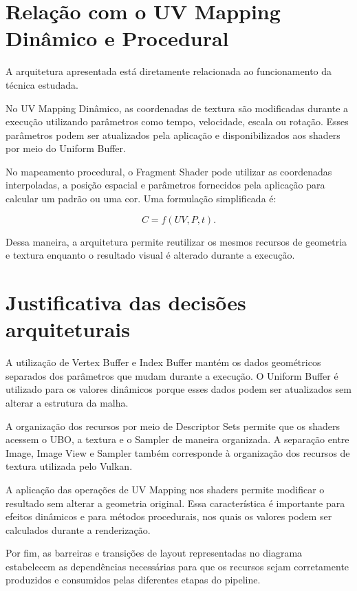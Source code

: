 \section{Relação com o UV Mapping Dinâmico e Procedural}

A arquitetura apresentada está diretamente relacionada ao funcionamento da
técnica estudada.

No UV Mapping Dinâmico, as coordenadas de textura são modificadas durante a
execução utilizando parâmetros como tempo, velocidade, escala ou rotação.
Esses parâmetros podem ser atualizados pela aplicação e disponibilizados aos
shaders por meio do Uniform Buffer.

No mapeamento procedural, o Fragment Shader pode utilizar as coordenadas
interpoladas, a posição espacial e parâmetros fornecidos pela aplicação para
calcular um padrão ou uma cor. Uma formulação simplificada é:

\begin{equation}
C=f(UV,P,t).
\end{equation}

Dessa maneira, a arquitetura permite reutilizar os mesmos recursos de
geometria e textura enquanto o resultado visual é alterado durante a
execução.

\section{Justificativa das decisões arquiteturais}

A utilização de Vertex Buffer e Index Buffer mantém os dados geométricos
separados dos parâmetros que mudam durante a execução. O Uniform Buffer é
utilizado para os valores dinâmicos porque esses dados podem ser atualizados
sem alterar a estrutura da malha.

A organização dos recursos por meio de Descriptor Sets permite que os
shaders acessem o UBO, a textura e o Sampler de maneira organizada. A
separação entre Image, Image View e Sampler também corresponde à organização
dos recursos de textura utilizada pelo Vulkan.

A aplicação das operações de UV Mapping nos shaders permite modificar o
resultado sem alterar a geometria original. Essa característica é importante
para efeitos dinâmicos e para métodos procedurais, nos quais os valores
podem ser calculados durante a renderização.

Por fim, as barreiras e transições de layout representadas no diagrama
estabelecem as dependências necessárias para que os recursos sejam
corretamente produzidos e consumidos pelas diferentes etapas do pipeline.